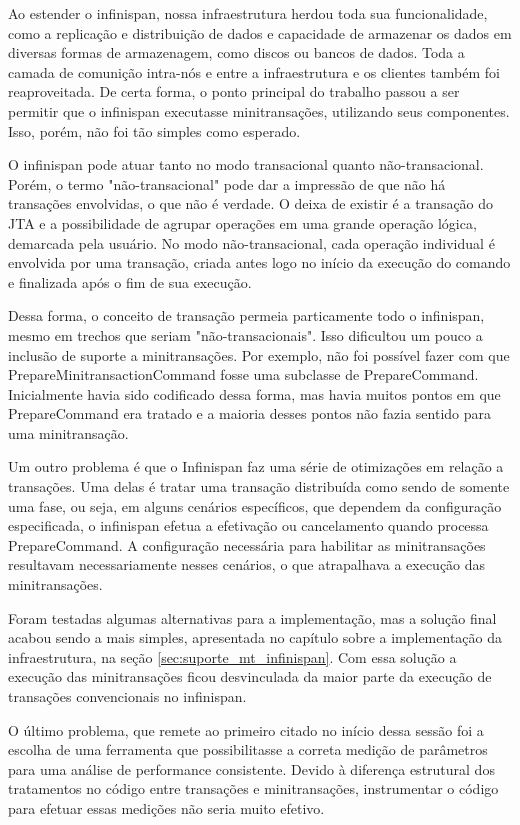 \documentclass[11pt,twoside,a4paper]{book}
\begin{document}
Ao estender o infinispan, nossa infraestrutura herdou toda sua funcionalidade, como a replicação e distribuição de dados e capacidade de armazenar os dados em diversas formas de armazenagem, como discos ou bancos de dados. Toda a camada de comunição intra-nós e entre a infraestrutura e os clientes também foi reaproveitada. De certa forma, o ponto principal do trabalho passou a ser permitir que o infinispan executasse minitransações, utilizando seus componentes. Isso, porém, não foi tão simples como esperado.

O infinispan pode atuar tanto no modo transacional quanto não-transacional. Porém, o termo "não-transacional" pode dar a impressão de que não há transações envolvidas, o que não é verdade. O deixa de existir é a transação do JTA e a possibilidade de agrupar operações em uma grande operação lógica, demarcada pela usuário. No modo não-transacional, cada operação individual é envolvida por uma transação, criada antes logo no início da execução do comando e finalizada após o fim de sua execução.

Dessa forma, o conceito de transação permeia particamente todo o infinispan, mesmo em trechos que seriam "não-transacionais". Isso dificultou um pouco a inclusão de suporte a minitransações. Por exemplo, não foi possível fazer com que PrepareMinitransactionCommand fosse uma subclasse de PrepareCommand. Inicialmente havia sido codificado dessa forma, mas havia muitos pontos em que PrepareCommand era tratado e a maioria desses pontos não fazia sentido para uma minitransação.

Um outro problema é que o Infinispan faz uma série de otimizações em relação a transações. Uma delas é tratar uma transação distribuída como sendo de somente uma fase, ou seja, em alguns cenários específicos, que dependem da configuração especificada, o infinispan efetua a efetivação ou cancelamento quando processa PrepareCommand. A configuração necessária para habilitar as minitransações resultavam necessariamente nesses cenários, o que atrapalhava a execução das minitransações.

Foram testadas algumas alternativas para a implementação, mas a solução final acabou sendo a mais simples, apresentada no capítulo sobre a implementação da infraestrutura, na seção \ref{sec:suporte_mt_infinispan}. Com essa solução a execução das minitransações ficou desvinculada da maior parte da execução de transações convencionais no infinispan.

O último problema, que remete ao primeiro citado no início dessa sessão foi a escolha de uma ferramenta que possibilitasse a correta medição de parâmetros para uma análise de performance consistente. Devido à diferença estrutural dos tratamentos no código entre transações e minitransações, instrumentar o código para efetuar essas medições não seria muito efetivo.
\end{document}
